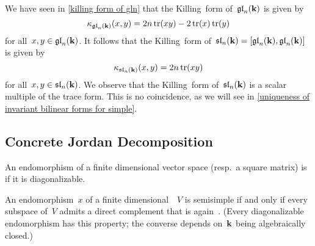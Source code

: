 

\begin{example}
  \label{killing form of sln}
  We have seen in \cref{killing form of gln} that the Killing~form of~$\mathfrak{gl}_n(\mathbf{k})$ is given by
  \[
    \kappa_{\mathfrak{gl}_n(\mathbf{k})}(x,y)
    =
    2n \operatorname{tr}(xy) - 2\operatorname{tr}(x)\operatorname{tr}(y)
  \]
  for all~$x, y \in \mathfrak{gl}_n(\mathbf{k})$.
  It follows that the Killing~form of~$\mathfrak{sl}_n(\mathbf{k}) = [\mathfrak{gl}_n(\mathbf{k}), \mathfrak{gl}_n(\mathbf{k})]$ is given by
  \[
    \kappa_{\mathfrak{sl}_n(\mathbf{k})}(x,y)
    =
    2n \operatorname{tr}(xy)
  \]
  for all~$x, y \in \mathfrak{sl}_n(\mathbf{k})$.
  We observe that the Killing~form of~$\mathfrak{sl}_n(\mathbf{k})$ is a scalar multiple of the trace form.
  This is no coincidence, as we will see in \cref{uniqueness of invariant bilinear forms for simple}.
\end{example}





\subsection{Concrete Jordan Decomposition}


\begin{definition}
  An endomorphism of a finite dimensional vector space (resp.\ a square matrix) is  if it is diagonalizable.
\end{definition}


\begin{remark}
  An endomorphism~$x$ of a finite dimensional~{\vectorspace{$\kf$}}~$V$ is semisimple if and only if every~{} subspace of~$V$ admits a direct complement that is again~{}.
  (Every diagonalizable endomorphism has this property;
  the converse depends on~$\kf$ being algebraically closed.)
\end{remark}


